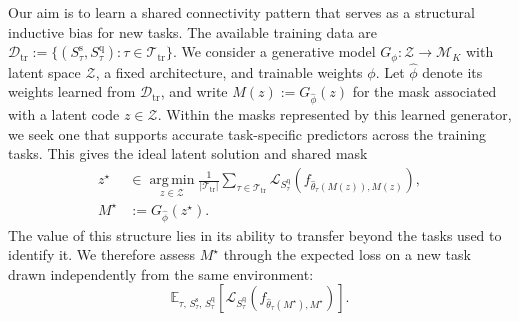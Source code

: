 Our aim is to learn a shared connectivity pattern that serves as a
structural inductive bias for new tasks. The available training data are
$\mathcal{D}_{\mathrm{tr}}:=\{(S_\tau^{\mathrm{s}},S_\tau^{\mathrm{q}}):
\tau\in\mathcal{T}_{\mathrm{tr}}\}$.
We consider a generative model $G_\phi:\mathcal{Z}\to\mathcal{M}_K$
with latent space $\mathcal{Z}$, a fixed architecture, and trainable weights $\phi$.
Let $\widehat\phi$ denote its weights learned from $\mathcal{D}_{\mathrm{tr}}$,
and write $M(z):=G_{\widehat\phi}(z)$ for the mask associated with a
latent code $z\in\mathcal{Z}$.
Within the masks represented by this learned generator, we seek one
that supports accurate task-specific predictors across the training
tasks. This gives the ideal latent solution and shared mask
\begin{equation}
    \begin{aligned}
        z^\star &\in \operatorname*{arg\,min}_{z\in\mathcal{Z}}
        \frac{1}{|\mathcal{T}_{\mathrm{tr}}|}
        \sum_{\tau\in\mathcal{T}_{\mathrm{tr}}}
        \mathcal{L}_{S_\tau^{\mathrm{q}}}
        \!\left(f_{\widehat\theta_\tau(M(z)),M(z)}\right), \\
        M^\star &:=G_{\widehat\phi}(z^\star).
    \end{aligned}
    \label{eq:generative-transfer-objective}
\end{equation}
The value of this structure lies in its ability to transfer beyond
the tasks used to identify it. We therefore assess $M^\star$ through
the expected loss on a new task drawn independently from the same
environment:
\begin{equation}
    \mathbb{E}_{\tau,\,S_\tau^{\mathrm{s}},\,S_\tau^{\mathrm{q}}}
    \left[
        \mathcal{L}_{S_\tau^{\mathrm{q}}}
        \!\left(f_{\widehat\theta_\tau(M^\star),M^\star}\right)
    \right].
    \label{eq:transfer-query-loss}
\end{equation}
